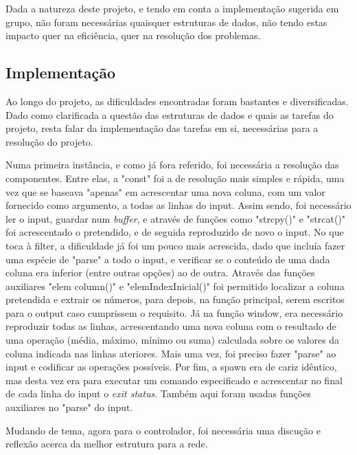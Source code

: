 \documentclass[a4paper]{article}
\begin{document}
\hspace{3mm} Dada a natureza deste projeto, e tendo em conta a implementação sugerida em grupo, não foram necessárias quaisquer estruturas de dados, não tendo estas impacto quer na eficiência, quer na resolução dos problemas. 


\subsection{Implementação}
\label{sec:5}

\hspace{3mm} Ao longo do projeto, as dificuldades encontradas foram bastantes e diversificadas.
Dado como clarificada a questão das estruturas de dados e quais as tarefas do projeto, resta falar da implementação das tarefas em si, necessárias para a resolução do projeto. 
\par Numa primeira instância, e como já fora referido, foi necessária a resolução das componentes. Entre elas, a "const" foi a de resolução mais simples e rápida, uma vez que se baseava "apenas" em acrescentar uma nova coluna, com um valor fornecido como argumento, a todas as linhas do input. Assim sendo, foi necessário ler o input, guardar num \emph{buffer}, e através de funções como "strcpy()" e "strcat()" foi acrescentado o pretendido, e de seguida reproduzido de novo o input.
No que toca à filter, a dificuldade já foi um pouco mais acrescida, dado que incluía fazer uma espécie de "parse" a todo o input, e verificar se o conteúdo de uma dada coluna era inferior (entre outras opções) ao de outra. Através das funções auxiliares "elem column()" e "elemIndexInicial()" foi permitido localizar a coluna pretendida e extrair os números, para depois, na função principal, serem escritos para o output caso cumprissem o requisito.
Já na função window, era necessário reproduzir todas as linhas, acrescentando uma nova coluna com o resultado de uma operação (média, máximo, mínimo ou suma) calculada sobre os valores da coluna indicada nas linhas ateriores. Mais uma vez, foi preciso fazer "parse" ao input e codificar as operações possíveis.
Por fim, a spawn era de cariz idêntico, mas desta vez era para executar um comando especificado e acrescentar no final de cada linha do input o \emph{exit status}. Também aqui foram usadas funções auxiliares no "parse" do input.
\par Mudando de tema, agora para o controlador, foi necessária uma discução e reflexão acerca da melhor estrutura para a rede.
\end{document}
